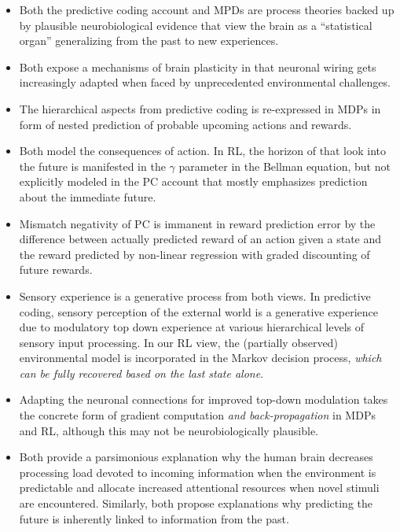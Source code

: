 \documentclass{article} %
\begin{document}
\begin{itemize}
  \item Both the predictive coding account and MPDs
  are process theories backed up by plausible
  neurobiological evidence that
  view the brain as a ``statistical organ''
  generalizing from the past to new experiences.
  \item Both expose a mechanisms of brain plasticity in that 
  neuronal wiring gets increasingly adapted
  when faced by unprecedented environmental
  challenges.
  \item The hierarchical aspects from predictive coding
  is re-expressed in MDPs in form of
  nested prediction of probable upcoming actions and rewards.
  \item Both model the consequences of action. In RL, the horizon of that
  look into the future is manifested in the $\gamma$ parameter
  in the Bellman equation, but not
  explicitly modeled in the PC account that
  mostly emphasizes prediction about the
  immediate future.
  \item Mismatch negativity of PC is immanent in reward prediction error
  by the difference between actually predicted reward of an action given
  a state and the reward predicted by non-linear regression with graded
  discounting of future rewards.
  \item Sensory experience is a generative process from both views.
  In predictive coding, sensory perception of the external world
  is a generative experience due to modulatory top down experience at
  various hierarchical levels of sensory input processing.
  In our RL view, the (partially observed)
  environmental model is incorporated in the Markov decision
  process, \textit{which can be fully recovered based on the last
  state alone}.
  \item Adapting the neuronal connections for improved top-down modulation
  takes the concrete form of gradient computation
  \textit{and back-propagation} in MDPs and RL,
  although this may not be neurobiologically plausible.
  \item Both provide a parsimonious explanation why the
  human brain decreases processing load devoted to incoming information
  when the environment is predictable and allocate increased
  attentional resources when novel stimuli are encountered.
  Similarly, both propose explanations why
  predicting the future is inherently
  linked to information from the past.
\end{itemize}
\end{document}
